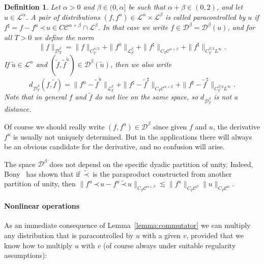 \documentclass[a4paper,11pt]{article}
\newcommand{\nocomma}{}
\newcommand{\tmtextit}[1]{{\itshape{#1}}}
\newtheorem{definition}{Definition}
{\theorembodyfont{\rmfamily}\newtheorem{example}{Example}}
{\theorembodyfont{\rmfamily\small\it}\newtheorem{exercise}{Exercise}}
\newcommand{\LL}{\mathscr{L}}
\newcommand{\CC}{\mathscr{C}}
\newcommand{\CD}{\mathscr{D}}
\newcommand{\DD}{\mathscr{D}}
\newcommand{\lpara}{\,\mathord{\prec}\,}
\begin{document}
\begin{definition}
  \label{def:paracontrolled parabolic}Let $\alpha > 0$ and $\beta \in (0,
  \alpha]$ be such that $\alpha + \beta \in (0, 2)$, and let $u \in
  \LL^{\alpha}$. A pair of distributions $(f, f^u) \in \LL^{\alpha} \times
  \LL^{\beta}$ is called \tmtextit{paracontrolled} by $u$ if $f^{\sharp} = f -
  f^u \lpara u \in C \CC^{\alpha + \beta} \cap \LL^{\beta}$. In that case we
  write $f \in \CD^{\beta} = \CD^{\beta} (u)$, and for all $T > 0$ we define
  the norm
  \[ \| f \|_{\DD_T^{\beta}} = \| f \|_{C^{\alpha / 2}_T} + \| f^u
     \|_{\LL^{\beta}_T} + \| f^{\sharp} \|_{C_T \CC^{\alpha + \beta}} + \|
     f^{\sharp} \|_{C_T^{\beta / 2} L^{\infty}} . \]
  If $\tilde{u} \in \LL^{\alpha}$ and $(\tilde{f}, \tilde{f}^{\tilde{u}}) \in
  \DD^{\beta} (\tilde{u}) \nocomma$, then we also write
  \[ d_{\DD^{\beta}_T} (f, \tilde{f}) = \| f^u - \tilde{f}^{\tilde{u}}
     \|_{\LL^{\beta}_T} + \|f^{\sharp} - \tilde{f}^{\sharp} \|_{C_T
     \CC^{\alpha + \beta}} + \|f^{\sharp} - \tilde{f}^{\sharp} \|_{C_T^{\beta
     / 2} L^{\infty}} . \]
     Note that in general $f$ and $\tilde f$ do not live on the same space, so $d_{\DD^{\beta}_T}$ is not a distance.
\end{definition}

Of course we should really write $(f, f^u) \in \CD^{\beta}$ since given $f$
and $u$, the derivative $f^u$ is usually not uniquely determined. But in the
applications there will always be an obvious candidate for the derivative, and
no confusion will arise.

\begin{remark}
  The space $\CD^{\beta}$ does not depend on the specific dyadic partition of
  unity. Indeed, Bony~{\cite{Bony1981}} has shown that if $\tilde{\lpara}$ is
  the paraproduct constructed from another partition of unity, then $\| f^u
  \lpara u - f^u \tilde{\lpara} u \|_{C_T \CC^{\alpha + \beta}} \lesssim \| f^u
  \|_{C_T \CC^{\beta}} \| u \|_{C_T \CC^{\alpha}}$.
\end{remark}

\paragraph{Nonlinear operations}As an immediate consequence of
Lemma~\ref{lemma:commutator} we can multiply any distribution that is paracontrolled by $u$ with a given $v$,
provided that we know how to multiply $u$ with $v$ (of course always under suitable regularity assumptions):
\end{document}
